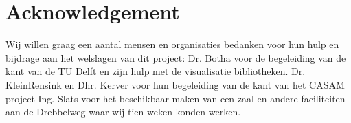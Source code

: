 \section{Acknowledgement}
\label{Acknowledgement}
Wij willen graag een aantal mensen en organisaties bedanken voor hun hulp en bijdrage aan het welslagen van dit project:
Dr. Botha voor de begeleiding van de kant van de TU Delft en zijn hulp met de visualisatie bibliotheken.
Dr. KleinRensink en Dhr. Kerver voor hun begeleiding van de kant van het CASAM project
Ing. Slats voor het beschikbaar maken van een zaal en andere faciliteiten aan de Drebbelweg waar wij tien weken konden werken.


